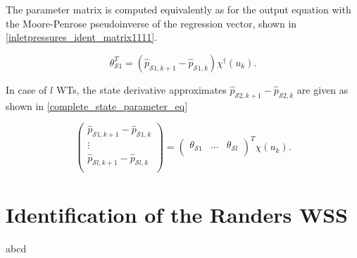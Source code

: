 The parameter matrix is computed equivalently as for the output equation with the Moore-Penrose pseudoinverse of the regression vector, shown in \eqref{inletpressures_ident_matrix1111}.

  \begin{equation}
\label{inletpressures_ident_matrix1111}
 \theta^T_{\mathcal{S}1} = (\hat{p}_{\mathcal{S}1,k+1} - \hat{p}_{\mathcal{S}1,k})  \chi^{\dagger}(u_k). 
\end{equation}

In case of $l$ WTs, the state derivative approximates $\hat{p}_{\mathcal{S}2,k+1}\! -\! \hat{p}_{\mathcal{S}2,k}$ are given as shown in \eqref{complete_state_parameter_eq}

\begin{equation}
\label{complete_state_parameter_eq}
         \begin{pmatrix}
           \hat{p}_{\mathcal{S}1,k+1} - \hat{p}_{\mathcal{S}1,k} \\[1pt]
           \vdots\\[1pt]
           \hat{p}_{\mathcal{S}l,k+1} - \hat{p}_{\mathcal{S}l,k} \\[1pt]
         \end{pmatrix}
         =
          \begin{pmatrix}
           \theta_{\mathcal{S}1} & \! \hdots \! & \theta_{\mathcal{S}l} \\[1pt]
         \end{pmatrix}^T
\chi(u_k).
\end{equation}

\section{Identification of the Randers WSS}
\label{identification_of_the_randers_WSS} 

abcd


